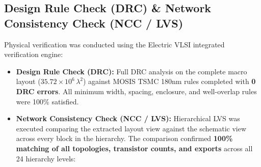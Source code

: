 \documentclass[10pt,a4paper,titlepage]{article}
\begin{document}
\subsection{Design Rule Check (DRC) \& Network Consistency Check (NCC / LVS)}
Physical verification was conducted using the Electric VLSI integrated verification engine:
\begin{itemize}[itemsep=3pt]
    \item \textbf{Design Rule Check (DRC):} Full DRC analysis on the complete macro layout ($35.72 \times 10^6\,\lambda^2$) against MOSIS TSMC 180nm rules completed with \textbf{0 DRC errors}. All minimum width, spacing, enclosure, and well-overlap rules were 100\% satisfied.
    \item \textbf{Network Consistency Check (NCC / LVS):} Hierarchical LVS was executed comparing the extracted layout view against the schematic view across every block in the hierarchy. The comparison confirmed \textbf{100\% matching of all topologies, transistor counts, and exports} across all 24 hierarchy levels:
\end{itemize}
\end{document}
